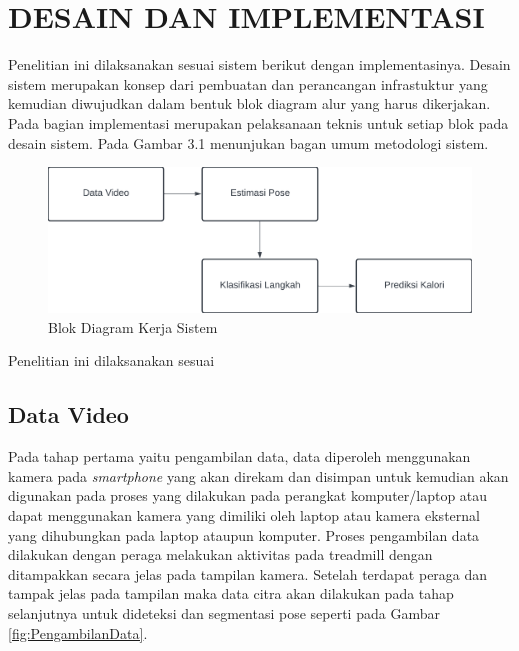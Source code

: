 \chapter{DESAIN DAN IMPLEMENTASI}
\label{chap:desainimplementasi}

Penelitian ini dilaksanakan sesuai sistem berikut dengan implementasinya. Desain sistem merupakan konsep dari pembuatan dan perancangan infrastuktur yang kemudian diwujudkan dalam bentuk blok diagram alur yang harus dikerjakan. Pada bagian implementasi merupakan pelaksanaan teknis untuk setiap blok pada desain sistem. Pada Gambar 3.1 menunjukan bagan umum metodologi sistem.

\begin{figure}[H]
  \centering
  \includegraphics[scale=0.215]{gambar/blok diagram metodologi4.png}
  \caption{Blok Diagram Kerja Sistem}
  \label{fig:BlokDiagram}
\end{figure}

Penelitian ini dilaksanakan sesuai \lipsum[1][1-5]

\section{Data Video}
\label{sec:PengambilanData}

Pada tahap pertama yaitu pengambilan data, data diperoleh menggunakan kamera pada \emph{smartphone} yang akan direkam dan disimpan untuk kemudian akan digunakan pada proses yang dilakukan pada perangkat komputer/laptop atau dapat menggunakan kamera yang dimiliki oleh laptop atau kamera eksternal yang dihubungkan pada laptop ataupun komputer. Proses pengambilan data dilakukan dengan peraga melakukan aktivitas pada treadmill dengan ditampakkan secara jelas pada tampilan kamera. Setelah terdapat peraga dan tampak jelas pada tampilan maka data citra akan dilakukan pada tahap selanjutnya untuk dideteksi dan segmentasi pose seperti pada Gambar \ref{fig:PengambilanData}.

